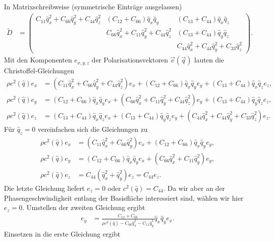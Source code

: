 \documentclass[english, parskip=full]{scrartcl}
\newcommand{\kla}{}
\begin{document}
In Matrixschreibweise (symmetrische Einträge ausgelassen)
\begin{align}
\tilde{D} &= \begin{pmatrix}
C_{11}\hat{q}_x^2 + C_{66}\hat{q}_y^2 + C_{44}\hat{q}_z^2 & (C_{12} + C_{66})\hat{q}_x\hat{q}_y & (C_{13} + C_{44}) \hat{q}_x\hat{q}_z \\
& C_{66}\hat{q}_x^2 + C_{11} \hat{q}_y^2 + C_{44}\hat{q}_z^2 & (C_{13} + C_{44}) \hat{q}_y\hat{q}_z \\
& & C_{44}\hat{q}_x^2 + C_{44}\hat{q}_y^2 + C_{33} \hat{q}_z^2
\end{pmatrix}.
\end{align}
Mit den Komponenten $e_{x,y,z}$ der Polarisationsvektoren $\vec{e}(\vec{q})$ lauten die Christoffel-Gleichungen
\begin{align}
\rho c^2(\hat{q}) e_x &= \kla\left( C_{11}\hat{q}_x^2 + C_{66}\hat{q}_y^2 + C_{44}\hat{q}_z^2 \right)e_x + (C_{12} + C_{66})\hat{q}_x\hat{q}_y e_y + (C_{13} + C_{44}) \hat{q}_x\hat{q}_z e_z,\\
\rho c^2(\hat{q}) e_y &= (C_{12} + C_{66})\hat{q}_x\hat{q}_y e_x + \kla\left( C_{66}\hat{q}_x^2 + C_{11} \hat{q}_y^2 + C_{44}\hat{q}_z^2 \right)e_y + (C_{13} + C_{44}) \hat{q}_y\hat{q}_z e_z,\\
\rho c^2(\hat{q}) e_z &= (C_{13} + C_{44}) \hat{q}_x\hat{q}_z e_x + (C_{13} + C_{44}) \hat{q}_y\hat{q}_z e_y + \kla\left( C_{44}\hat{q}_x^2 + C_{44}\hat{q}_y^2 + C_{33} \hat{q}_z^2 \right) e_z.
\end{align}
Für $\hat{q}_z=0$ vereinfachen sich die Gleichungen zu
\begin{align}
\rho c^2(\hat{q}) e_x &= \kla\left( C_{11}\hat{q}_x^2 + C_{66}\hat{q}_y^2 \right)e_x + (C_{12} + C_{66})\hat{q}_x\hat{q}_y e_y,\\
\rho c^2(\hat{q}) e_y &= (C_{12} + C_{66})\hat{q}_x\hat{q}_y e_x + \kla\left( C_{66}\hat{q}_x^2 + C_{11} \hat{q}_y^2 \right)e_y,\\
\rho c^2(\hat{q}) e_z &= C_{44} \kla\left( \hat{q}_x^2 + \hat{q}_y^2 \right) e_z = C_{44} e_z.
\end{align}
Die letzte Gleichung liefert $e_z=0$ oder $c^2(\hat{q}) = C_{44}$.
Da wir aber an der Phasengeschwindigkeit entlang der Basisfläche interessiert sind, wählen wir hier $e_z=0$.
Umstellen der zweiten Gleichung ergibt
\begin{align}
e_y &= \frac{C_{12} + C_{66}}{\rho c^2(\hat{q}) - C_{66}\hat{q}_x^2 - C_{11} \hat{q}_y^2}\hat{q}_x\hat{q}_y e_x.
\end{align}
Einsetzen in die erste Gleichung ergibt
\end{document}
